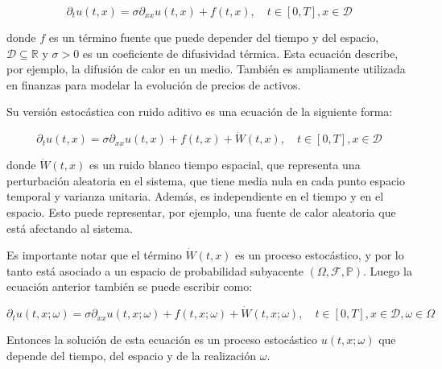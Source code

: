 \[
  \partial_t u(t,x) = \sigma\partial_{xx} u(t,x) + f(t,x), \quad t \in [0,T], x \in \mathcal{D}
\]

donde $f$ es un término fuente que puede depender del tiempo y del espacio, $\mathcal{D} \subseteq \mathbb{R}$ y $\sigma >0$ es un coeficiente de difusividad térmica. Esta ecuación describe, por ejemplo, la difusión de calor en un medio. También es ampliamente utilizada en finanzas para modelar la evolución de precios de activos.

Su versión estocástica con ruido aditivo es una ecuación de la siguiente forma:

\[
  \partial_t u(t,x) = \sigma\partial_{xx} u(t,x) + f(t,x) + \dot{W}(t,x), \quad t \in [0,T], x \in \mathcal{D}
\]

donde $\dot{W}(t,x)$ es un ruido blanco tiempo espacial, que representa una perturbación aleatoria en el sistema, que tiene media nula en cada punto espacio temporal y varianza unitaria. Además, es independiente en el tiempo y en el espacio. Esto puede representar, por ejemplo, una fuente de calor aleatoria que está afectando al sistema.

Es importante notar que el término $\dot{W}(t,x)$ es un proceso estocástico, y por lo tanto está asociado a un espacio de probabilidad subyacente $(\Omega, \mathcal{F}, \mathbb{P})$. Luego la ecuación anterior también se puede escribir como:

\[
  \partial_t u(t,x ;\omega) = \sigma\partial_{xx} u(t,x ; \omega) + f(t,x ; \omega) + \dot{W}(t,x ; \omega), \quad t \in [0,T], x \in \mathcal{D}, \omega \in \Omega
\]

Entonces la solución de esta ecuación es un proceso estocástico $u(t,x ; \omega)$ que depende del tiempo, del espacio y de la realización $\omega$.
